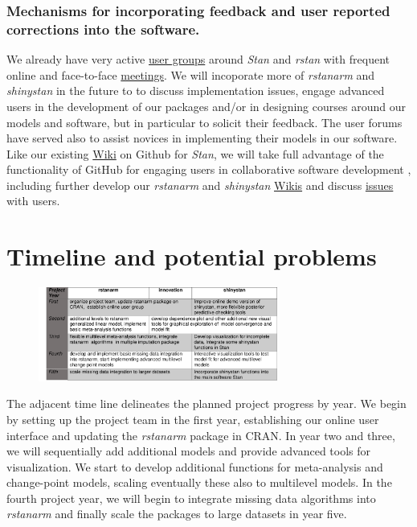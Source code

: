\documentclass[11pt,notitlepage]{article}
\begin{document}
\subsubsection*{Mechanisms for incorporating feedback and user reported corrections into the software.}

We already have very active \href{https://groups.google.com/forum/#!forum/stan-users} {user groups} around \textit{Stan} and 
\textit{rstan}  with frequent online and face-to-face \href{http://www.meetup.com/bda-group/}{meetings}. We will incoporate more of
\textit{rstanarm} and \textit{shinystan} in the future to to discuss implementation issues, engage advanced users in the development of 
our packages and/or in designing courses around our models and software, but in particular to solicit their feedback. The user 
forums have served also to assist novices in implementing their models in our software.
Like our existing \href{https://github.com/stan-dev/example-models/wiki}{Wiki} on Github for \textit{Stan}, we will 
take full advantage of the functionality of GitHub for engaging users in collaborative software development \cite{loeliger2012version}, 
including further develop our \textit{rstanarm} and \textit{shinystan} 
\href{https://github.com/stan-dev/rstanarm/wiki}{Wikis} and discuss \href{https://github.com/stan-dev/rstanarm/issues}{issues} with users.

\section*{Timeline and potential problems}

\begin{figure} %
    \centering
\includegraphics[width=0.7\textwidth]{Figures/Timeline.pdf}
\end{figure}

The adjacent time line delineates the planned project progress by year. We begin by setting up the project team in the first year, 
establishing our online user interface and updating the \textit{rstanarm} package in CRAN. In year two and three, we will sequentially 
add additional models and provide advanced tools for visualization. We start to develop additional functions for meta-analysis and 
change-point models, scaling eventually these also to multilevel models. In the fourth project year, we will begin to integrate 
missing data algorithms into \textit{rstanarm} and finally scale the packages to large datasets in year five.
\end{document}
